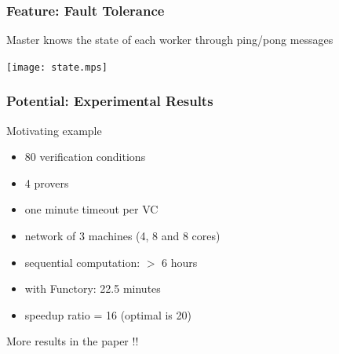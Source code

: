 \documentclass[xcolor=dvipsnames,8pt]{beamer}
\let\emph\alert
\begin{document}


\begin{frame}\frametitle {Feature: Fault Tolerance}

Master knows the state of each worker through ping/pong messages

  \begin{center}
    \texttt{[image: state.mps]}
  \end{center}

  
\end{frame}



\begin{frame}\frametitle {Potential: Experimental Results}
  Motivating example
  \begin{itemize}
  \item 80 verification conditions
  \item 4 provers
  \item one minute timeout per VC
  \item network of 3 machines (4, 8 and 8 cores)
  \end{itemize}


\bigskip
  \begin{itemize}
  \item sequential computation: \emph{$>$ 6 hours}
  \item with Functory: \emph{22.5 minutes}
  \item speedup ratio = \emph{16} (optimal is 20)
  \end{itemize}
  \begin{center}
  More results in the paper !!    
  \end{center}

\end{frame}

\end{document}
